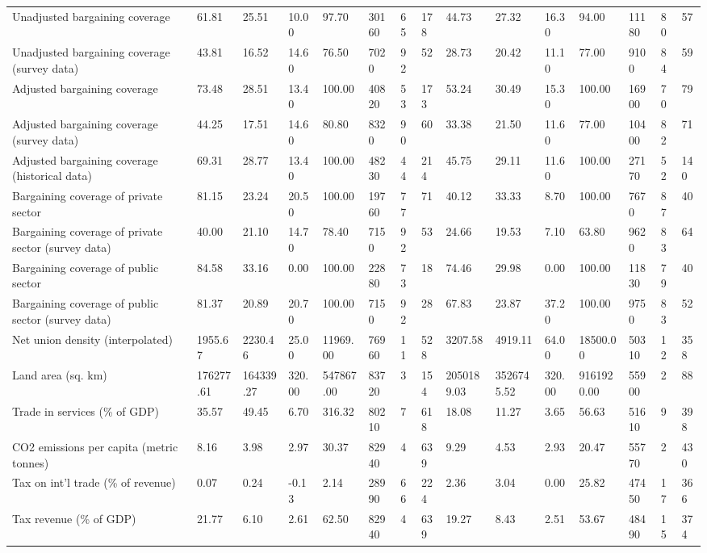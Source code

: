 \begin{longtable}{lllllllllllllll}
Unadjusted bargaining coverage & 61.81 & 25.51 & 10.00 & 97.70 & 30160 & 65 & 178 & 44.73 & 27.32 & 16.30 & 94.00 & 11180 & 80 & 57\\
\addlinespace
Unadjusted bargaining coverage (survey data) & 43.81 & 16.52 & 14.60 & 76.50 & 7020 & 92 & 52 & 28.73 & 20.42 & 11.10 & 77.00 & 9100 & 84 & 59\\
Adjusted bargaining coverage & 73.48 & 28.51 & 13.40 & 100.00 & 40820 & 53 & 173 & 53.24 & 30.49 & 15.30 & 100.00 & 16900 & 70 & 79\\
Adjusted bargaining coverage (survey data) & 44.25 & 17.51 & 14.60 & 80.80 & 8320 & 90 & 60 & 33.38 & 21.50 & 11.60 & 77.00 & 10400 & 82 & 71\\
Adjusted bargaining coverage (historical data) & 69.31 & 28.77 & 13.40 & 100.00 & 48230 & 44 & 214 & 45.75 & 29.11 & 11.60 & 100.00 & 27170 & 52 & 140\\
Bargaining coverage of private sector & 81.15 & 23.24 & 20.50 & 100.00 & 19760 & 77 & 71 & 40.12 & 33.33 & 8.70 & 100.00 & 7670 & 87 & 40\\
\addlinespace
Bargaining coverage of private sector (survey data) & 40.00 & 21.10 & 14.70 & 78.40 & 7150 & 92 & 53 & 24.66 & 19.53 & 7.10 & 63.80 & 9620 & 83 & 64\\
Bargaining coverage of public sector & 84.58 & 33.16 & 0.00 & 100.00 & 22880 & 73 & 18 & 74.46 & 29.98 & 0.00 & 100.00 & 11830 & 79 & 40\\
Bargaining coverage of public sector (survey data) & 81.37 & 20.89 & 20.70 & 100.00 & 7150 & 92 & 28 & 67.83 & 23.87 & 37.20 & 100.00 & 9750 & 83 & 52\\
Net union density (interpolated) & 1955.67 & 2230.46 & 25.00 & 11969.00 & 76960 & 11 & 528 & 3207.58 & 4919.11 & 64.00 & 18500.00 & 50310 & 12 & 358\\
Land area (sq. km) & 176277.61 & 164339.27 & 320.00 & 547867.00 & 83720 & 3 & 154 & 2050189.03 & 3526745.52 & 320.00 & 9161920.00 & 55900 & 2 & 88\\
\addlinespace
Trade in services (\% of GDP) & 35.57 & 49.45 & 6.70 & 316.32 & 80210 & 7 & 618 & 18.08 & 11.27 & 3.65 & 56.63 & 51610 & 9 & 398\\
CO2 emissions per capita (metric tonnes) & 8.16 & 3.98 & 2.97 & 30.37 & 82940 & 4 & 639 & 9.29 & 4.53 & 2.93 & 20.47 & 55770 & 2 & 430\\
Tax on int'l trade (\% of revenue) & 0.07 & 0.24 & -0.13 & 2.14 & 28990 & 66 & 224 & 2.36 & 3.04 & 0.00 & 25.82 & 47450 & 17 & 366\\
Tax revenue (\% of GDP) & 21.77 & 6.10 & 2.61 & 62.50 & 82940 & 4 & 639 & 19.27 & 8.43 & 2.51 & 53.67 & 48490 & 15 & 374\\

\end{longtable}
